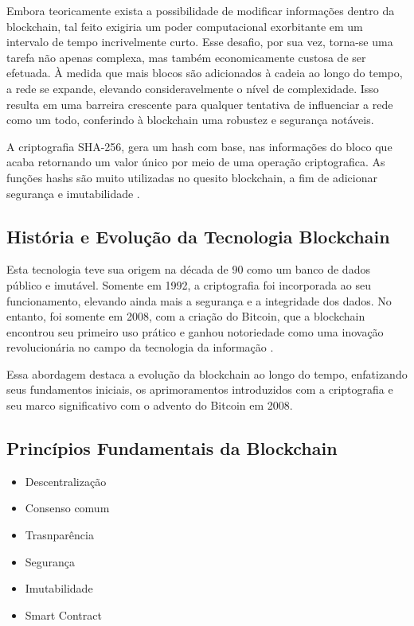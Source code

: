 Embora teoricamente exista a possibilidade de modificar informações dentro da blockchain, tal feito exigiria um poder computacional exorbitante em um intervalo de tempo incrivelmente curto. Esse desafio, por sua vez, torna-se uma tarefa não apenas complexa, mas também economicamente custosa de ser efetuada. À medida que mais blocos são adicionados à cadeia ao longo do tempo, a rede se expande, elevando consideravelmente o nível de complexidade. Isso resulta em uma barreira crescente para qualquer tentativa de influenciar a rede como um todo, conferindo à blockchain uma robustez e segurança notáveis.

A criptografia SHA-256, gera um hash com base, nas informações do bloco que acaba retornando um valor único por meio de uma operação criptografica. As funções hashs são muito utilizadas no quesito blockchain, a fim de adicionar segurança e imutabilidade \cite{bit2me}.


\subsection{História e Evolução da Tecnologia Blockchain}

Esta tecnologia teve sua origem na década de 90 como um banco de dados público e imutável. Somente em 1992, a criptografia foi incorporada ao seu funcionamento, elevando ainda mais a segurança e a integridade dos dados. No entanto, foi somente em 2008, com a criação do Bitcoin, que a blockchain encontrou seu primeiro uso prático e ganhou notoriedade como uma inovação revolucionária no campo da tecnologia da informação \cite{exame}.

Essa abordagem destaca a evolução da blockchain ao longo do tempo, enfatizando seus fundamentos iniciais, os aprimoramentos introduzidos com a criptografia e seu marco significativo com o advento do Bitcoin em 2008.


\subsection{Princípios Fundamentais da Blockchain}

\begin{itemize}
   \item Descentralização
   \item Consenso comum
   \item Trasnparência
    \item Segurança
   \item Imutabilidade
   \item Smart Contract
\end{itemize}

